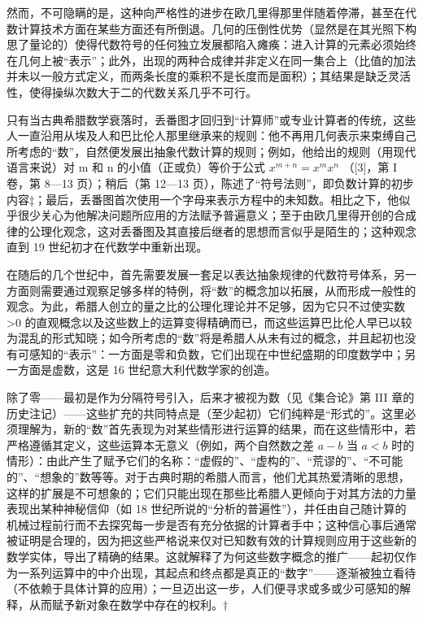然而，不可隐瞒的是，这种向严格性的进步在欧几里得那里伴随着停滞，甚至在代数计算技术方面在某些方面还有所倒退。几何的压倒性优势（显然是在其光照下构思了量论的）使得代数符号的任何独立发展都陷入瘫痪：进入计算的元素必须始终在几何上被“表示”；此外，出现的两种合成律并非定义在同一集合上（比值的加法并未以一般方式定义，而两条长度的乘积不是长度而是面积）；其结果是缺乏灵活性，使得操纵次数大于二的代数关系几乎不可行。

只有当古典希腊数学衰落时，丢番图才回归到“计算师”或专业计算者的传统，这些人一直沿用从埃及人和巴比伦人那里继承来的规则：他不再用几何表示来束缚自己所考虑的“数”，自然便发展出抽象代数计算的规则；例如，他给出的规则（用现代语言来说）对 m 和 n 的小值（正或负）等价于公式 \(x^{m+n} = x^{m}x^{n}\) （{[}3{]}，第 I 卷，第 8—13 页）；稍后（第 12—13 页），陈述了“符号法则”，即负数计算的初步内容‡；最后，丢番图首次使用一个字母来表示方程中的未知数。相比之下，他似乎很少关心为他解决问题所应用的方法赋予普遍意义；至于由欧几里得开创的合成律的公理化观念，这对丢番图及其直接后继者的思想而言似乎是陌生的；这种观念直到 19 世纪初才在代数学中重新出现。

在随后的几个世纪中，首先需要发展一套足以表达抽象规律的代数符号体系，另一方面则需要通过观察足够多样的特例，将“数”的概念加以拓展，从而形成一般性的观念。为此，希腊人创立的量之比的公理化理论并不足够，因为它只不过使实数 \textgreater0 的直观概念以及这些数上的运算变得精确而已，而这些运算巴比伦人早已以较为混乱的形式知晓；如今所考虑的“数”将是希腊人从未有过的概念，并且起初也没有可感知的“表示”：一方面是零和负数，它们出现在中世纪盛期的印度数学中；另一方面是虚数，这是 16 世纪意大利代数学家的创造。

除了零——最初是作为分隔符号引入，后来才被视为数（见《集合论》第 III 章的历史注记）——这些扩充的共同特点是（至少起初）它们纯粹是“形式的”。这里必须理解为，新的“数”首先表现为对某些情形进行运算的结果，而在这些情形中，若严格遵循其定义，这些运算本无意义（例如，两个自然数之差 \(a - b\) 当 \(a < b\) 时的情形）：由此产生了赋予它们的名称：“虚假的”、“虚构的”、“荒谬的”、“不可能的”、“想象的”数等等。对于古典时期的希腊人而言，他们尤其热爱清晰的思想，这样的扩展是不可想象的；它们只能出现在那些比希腊人更倾向于对其方法的力量表现出某种神秘信仰（如 18 世纪所说的“分析的普遍性”），并任由自己随计算的机械过程前行而不去探究每一步是否有充分依据的计算者手中；这种信心事后通常被证明是合理的，因为把这些严格说来仅对已知数有效的计算规则应用于这些新的数学实体，导出了精确的结果。这就解释了为何这些数字概念的推广——起初仅作为一系列运算中的中介出现，其起点和终点都是真正的“数字”——逐渐被独立看待（不依赖于具体计算的应用）；一旦迈出这一步，人们便寻求或多或少可感知的解释，从而赋予新对象在数学中存在的权利。†

